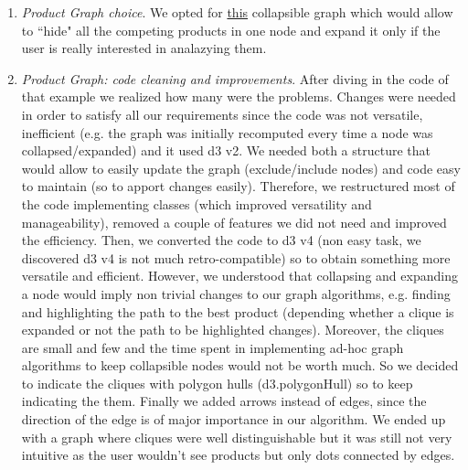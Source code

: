 \documentclass[a4paper,12pt]{article}
\begin{document}
\begin{enumerate}
	\item \textit{Product Graph choice}. We opted for \href{http://bl.ocks.org/GerHobbelt/3071239}{this} collapsible graph which would allow to ``hide" all the competing products in one node and expand it only if the user is really interested in analazying them. 

	\item \textit{Product Graph: code cleaning and improvements}. After diving in the code of that example we realized how many were the problems. Changes were needed in order to satisfy all our requirements since the code was not versatile, inefficient (e.g. the graph was initially recomputed every time a node was collapsed/expanded) and it used d3 v2. We needed both a structure that would allow to easily update the graph (exclude/include nodes) and code easy to maintain (so to apport changes easily). Therefore, we restructured most of the code implementing classes (which improved versatility and manageability), removed a couple of features we did not need and improved the efficiency. Then, we converted the code to d3 v4 (non easy task, we discovered d3 v4 is not much retro-compatible) so to obtain something more versatile and efficient. However, we understood that collapsing and expanding a node would imply non trivial changes to our graph algorithms, e.g. finding and highlighting the path to the best product (depending whether a clique is expanded or not the path to be highlighted changes). Moreover, the cliques are small and few and the time spent in implementing ad-hoc graph algorithms to keep collapsible nodes would not be worth much. So we decided to indicate the cliques with polygon hulls (d3.polygonHull) so to keep indicating the them. Finally we added arrows instead of edges, since the direction of the edge is of major importance in our algorithm.  We ended up with a graph where cliques were well distinguishable but it was still not very intuitive as the user wouldn't see products but only dots connected by edges.


\end{enumerate}
\end{document}
